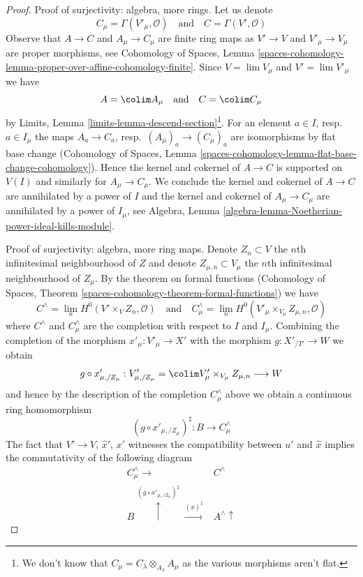 \begin{proof}
\medskip\noindent
Proof of surjectivity: algebra, more rings.
Let us denote
$$
C_\mu = \Gamma(V'_\mu, \mathcal{O})
\quad\text{and}\quad
C = \Gamma(V', \mathcal{O})
$$
Observe that $A \to C$ and $A_\mu \to C_\mu$ are finite ring maps as
$V' \to V$ and $V'_\mu \to V_\mu$ are proper morphisms, see
Cohomology of Spaces, Lemma
\ref{spaces-cohomology-lemma-proper-over-affine-cohomology-finite}.
Since $V = \lim V_\mu$ and $V' = \lim V'_\mu$
we have
$$
A = \colim A_\mu
\quad\text{and}\quad
C = \colim C_\mu
$$
by Limits, Lemma \ref{limits-lemma-descend-section}\footnote{We don't
know that $C_\mu = C_\lambda \otimes_{A_\lambda} A_\mu$ as the
various morphisms aren't flat.}. For an element
$a \in I$, resp.\ $a \in I_\mu$ the maps $A_a \to C_a$,
resp.\ $(A_\mu)_a \to (C_\mu)_a$ are isomorphisms by flat base change
(Cohomology of Spaces, Lemma
\ref{spaces-cohomology-lemma-flat-base-change-cohomology}).
Hence the kernel and cokernel of $A \to C$ is supported
on $V(I)$ and similarly for $A_\mu \to C_\mu$.
We conclude the kernel and cokernel of $A \to C$
are annihilated by a power of $I$ and the kernel and cokernel of
$A_\mu \to C_\mu$ are annihilated by a power of $I_\mu$, see
Algebra, Lemma \ref{algebra-lemma-Noetherian-power-ideal-kills-module}.

\medskip\noindent
Proof of surjectivity: algebra, more ring maps.
Denote $Z_n \subset V$ the $n$th infinitesimal
neighbourhood of $Z$ and denote $Z_{\mu, n} \subset V_\mu$
the $n$th infinitesimal neighbourhood of $Z_\mu$.
By the theorem on formal functions
(Cohomology of Spaces, Theorem
\ref{spaces-cohomology-theorem-formal-functions})
we have
$$
C^\wedge = \lim_n H^0(V' \times_V Z_n, \mathcal{O})
\quad\text{and}\quad
C_\mu^\wedge =
\lim_n H^0(V'_\mu \times_{V_\mu} Z_{\mu, n}, \mathcal{O})
$$
where $C^\wedge$ and $C_\mu^\wedge$ are the completion with
respect to $I$ and $I_\mu$.
Combining the completion of the morphism
$x'_\mu : V'_\mu \to X'$ with the morphism $g : X'_{/T'} \to W$ we obtain
$$
g \circ x'_{\mu, /Z_\mu} :
V'_{\mu, /Z_\mu} = \colim V_\mu' \times_{V_\mu} Z_{\mu, n}
\longrightarrow
W
$$
and hence by the description of the completion
$C_\mu^\wedge$ above we obtain a continuous ring homomorphism
$$
(g \circ x'_{\mu, /Z_\mu})^\sharp : B \longrightarrow C_\mu^\wedge
$$
The fact that $V' \to V$, $\hat x'$, $x'$ witnesses the compatibility
between $u'$ and $\hat x$ implies the
commutativity of the following diagram
$$
\begin{array}{cc}C_\mu^\wedge \longrightarrow & C^\wedge \\ B \overset{(g \circ x'_{\mu, /Z_\mu})^\sharp}{\uparrow}\overset{(\hat x)^\sharp}{\longrightarrow} & A^\wedge \uparrow\end{array}
$$


\end{proof}
